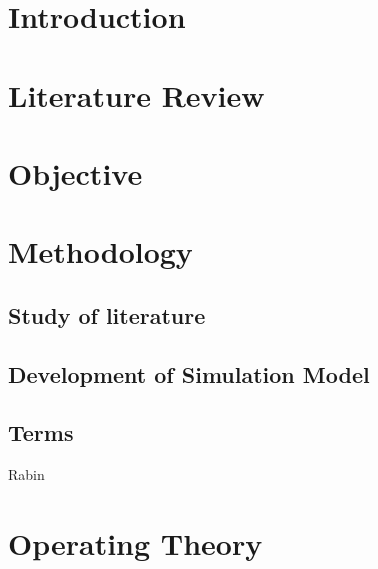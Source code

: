 \documentclass[12pt]{article}
\begin{document}

\tableofcontents
\newpage
\section{Introduction}
\section{Literature Review}
\section{Objective}
\section{Methodology}
\subsection{Study of literature}
\subsection{Development of Simulation Model}
\subsection{Terms}
Rabin \cite{rabin22}
\section{Operating Theory}


\end{document}
